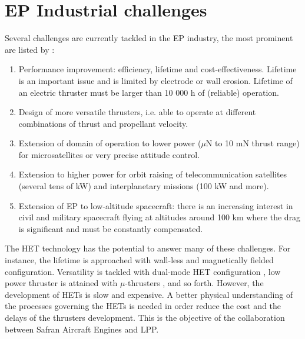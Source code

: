
\section*{EP Industrial challenges}
\label{sec-challenges}

Several challenges are currently tackled in the \ac{EP} industry, the most prominent are listed by \citet{samukawa2012}\string:
\begin{enumerate}
  \item Performance improvement\string: efficiency, lifetime and cost-effectiveness.
   Lifetime is an important issue and is limited by electrode or wall erosion.
   Lifetime of an electric thruster must be larger than 10 000 h of (reliable) operation.
   \item  Design of more versatile thrusters, i.e. able to operate at different combinations of thrust and propellant velocity.
   \item  Extension of domain of operation to lower power ($\mu$N to 10 mN thrust range) for microsatellites or very precise attitude control.
   \item  Extension to higher power for orbit raising of telecommunication satellites (several tens of kW) and    interplanetary missions (100 kW and more).
   \item Extension of EP to low-altitude spacecraft\string: there is an increasing interest in civil and military spacecraft flying  at altitudes around 100 km where the drag is significant and must be constantly compensated.
\end{enumerate}

The \ac{HET} technology has the potential to answer many of these challenges.
For instance, the lifetime is approached with wall-less and magnetically fielded configuration.
Versatility is tackled with dual-mode \ac{HET} configuration \citep{boniface2017}, low power thruster is attained with $\mu$-thrusters \citep{lascombes2018}, and so forth.
However, the development of \ac{HET}s is slow and expensive. 
A better physical understanding of the processes governing the \ac{HET}s is needed in order reduce the cost and the delays of the thrusters development.
This is the objective of the collaboration between Safran Aircraft Engines and \ac{LPP}.
